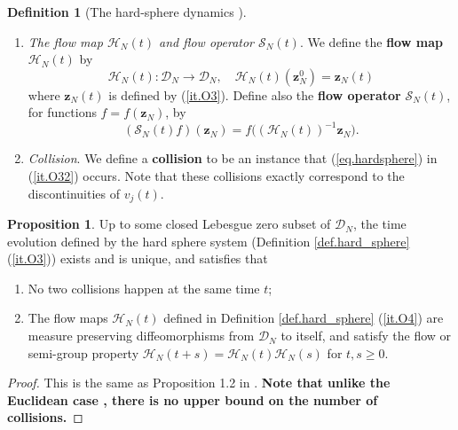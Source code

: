 \documentclass[10pt, reqno]{amsart}
\newcommand{\Rb}{\mathbb R}
\newcommand{\Tb}{\mathbb T}
\newcommand{\Dc}{\mathcal D}
\newcommand{\Hc}{\mathcal H}
\newcommand{\Sc}{\mathcal S}
\newcommand{\vz}{\boldsymbol{z}}
\theoremstyle{definition}
\newtheorem{proposition}[theorem]{Proposition}
\newtheorem{definition}[theorem]{Definition}
\theoremstyle{remark}
\numberwithin{equation}{section}
\begin{document}
\begin{definition}[The hard-sphere dynamics \cite{Alexander}]
\begin{enumerate}
\begin{enumerate}
\begin{figure}[h!]
\label{fig.1}
\end{figure}
\item \label{it.O33} If for certain $i$ there is no $j$ such that the scenario in (\ref{it.O32}) happens, then we have
\begin{equation}\label{eq.hardsphere2}\frac{\mathrm{d}}{\mathrm{d}t}(x_i,v_i)=(v_i,0).
\end{equation} Here (and same below) the $\mathrm{d}x_i/\mathrm{d}t$ in (\ref{eq.hardsphere2}) is understood as the time evolution of a suitable $\Rb^d$ representative of $x_i\in\Tb^d$.
\end{enumerate}
\item \label{it.O4}\emph{The flow map $\Hc_N(t)$ and flow operator $\Sc_N(t)$}. We define the \textbf{flow map} $\Hc_N(t)$ by
\begin{equation}\label{eq.defH^O}\Hc_N(t):\Dc_N\to\Dc_N,\quad\Hc_N(t)(\vz_N^0)=\vz_N(t)\end{equation} where $\vz_N(t)$ is defined by (\ref{it.O3}). Define also the \textbf{flow operator} $\Sc_N(t)$, for functions $f=f(\vz_N)$, by
\begin{equation}\label{eq.defS^O}
(\Sc_N(t) f)(\vz_N)=f\big((\Hc_N(t))^{-1}\vz_N\big).
\end{equation}
\item \label{it.O5} \emph{Collision}. We define a \textbf{collision} to be an instance that (\ref{eq.hardsphere}) in (\ref{it.O32}) occurs. Note that these collisions exactly correspond to the discontinuities of $v_j(t)$.
\end{enumerate}
\end{definition}
\begin{proposition}\label{prop.hardsphere} Up to some closed Lebesgue zero subset of $\Dc_N$, the time evolution defined by the hard sphere system (Definition \ref{def.hard_sphere} (\ref{it.O3})) exists and is unique, and satisfies that
\begin{enumerate}
\item No two collisions happen at the same time $t$;
\item The flow maps $\Hc_N(t)$ defined in Definition \ref{def.hard_sphere} (\ref{it.O4}) are measure preserving diffeomorphisms from $\Dc_N$ to itself, and satisfy the flow or semi-group property $\Hc_N(t+s)=\Hc_N(t)\Hc_N(s)$ for $t,s\geq 0$.
\end{enumerate}
\end{proposition}
\begin{proof} This is the same as Proposition 1.2 in \cite{DHM24}. \textbf{Note that unlike the Euclidean case \cite{DHM24}, there is no upper bound on the number of collisions.}
\end{proof}
\end{document}
